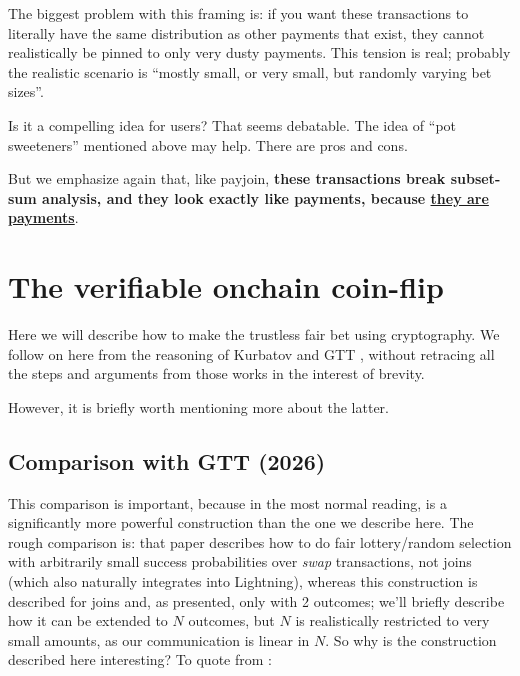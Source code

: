 \documentclass[11pt]{article}
\begin{document}
The biggest problem with this framing is: if you want these transactions to literally have the same distribution as other payments that exist, they cannot realistically be pinned to only very dusty payments. This tension is real; probably the realistic scenario is ``mostly small, or very small, but randomly varying bet sizes''.

Is it a compelling idea for users? That seems debatable. The idea of ``pot sweeteners'' mentioned above may help. There are pros and cons.

But we emphasize again that, like payjoin, \textbf{these transactions break subset-sum analysis, and they look exactly like payments, because \underline{they are payments}}.





\section{The verifiable onchain coin-flip}
\label{sec:crypto}

Here we will describe how to make the trustless fair bet using cryptography. We follow on here from the reasoning of Kurbatov \cite{kurbatov2025oprand} and GTT \cite{gerhardt2026}, without retracing all the steps and arguments from those works in the interest of brevity.

However, it is briefly worth mentioning more about the latter.

\subsection{Comparison with GTT (2026) \cite{gerhardt2026}}

This comparison is important, because in the most normal reading, \cite{gerhardt2026} is a significantly more powerful construction than the one we describe here. The rough comparison is: that paper describes how to do fair lottery/random selection with arbitrarily small success probabilities over \emph{swap} transactions, not joins (which also naturally integrates into Lightning), whereas this construction is described for joins and, as presented, only with 2 outcomes; we'll briefly describe how it can be extended to $N$ outcomes, but $N$ is realistically restricted to very small amounts, as our communication is linear in $N$. So why is the construction described here interesting? To quote from \cite{gerhardt2026} :
\end{document}
